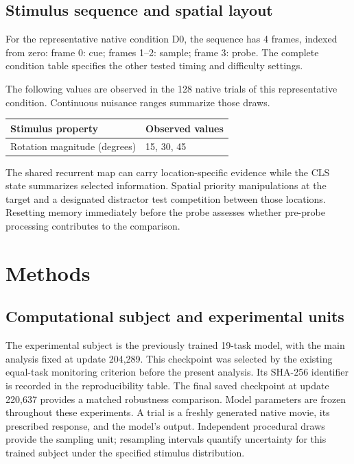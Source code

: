 \documentclass[11pt]{article}
\begin{document}
\subsection{Stimulus sequence and spatial layout}
For the representative native condition D0, the sequence has 4 frames, indexed from zero: frame 0: cue; frames 1--2: sample; frame 3: probe. The complete condition table specifies the other tested timing and difficulty settings.

The following values are observed in the 128 native trials of this representative condition. Continuous nuisance ranges summarize those draws.
\begin{center}\small\begin{tabular}{p{}p{}}\toprule Stimulus property & Observed values\\\midrule
Rotation magnitude (degrees) & 15, 30, 45\\
\bottomrule\end{tabular}\normalsize\end{center}
The shared recurrent map can carry location-specific evidence while the CLS state summarizes selected information. Spatial priority manipulations at the target and a designated distractor test competition between those locations. Resetting memory immediately before the probe assesses whether pre-probe processing contributes to the comparison.


\section{Methods}
\subsection{Computational subject and experimental units}
The experimental subject is the previously trained 19-task model, with the main analysis fixed at update 204,289. This checkpoint was selected by the existing equal-task monitoring criterion before the present analysis. Its SHA-256 identifier is recorded in the reproducibility table. The final saved checkpoint at update 220,637 provides a matched robustness comparison. Model parameters are frozen throughout these experiments. A trial is a freshly generated native movie, its prescribed response, and the model's output. Independent procedural draws provide the sampling unit; resampling intervals quantify uncertainty for this trained subject under the specified stimulus distribution.
\end{document}
